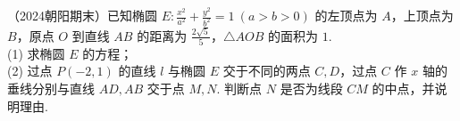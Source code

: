 \begin{example}
（2024朝阳期末）已知椭圆 $E:\frac{x^{2}}{a^{2}}+\frac{y^{2}}{b^{2}}=1\ (a>b>0)$ 的左顶点为 $A$，上顶点为 $B$，原点 $O$ 到直线 $AB$ 的距离为 $\frac{2\sqrt{5}}{5}$，$\triangle AOB$ 的面积为 $1$.\\
(1) 求椭圆 $E$ 的方程；\\
(2) 过点 $P(-2,1)$ 的直线 $l$ 与椭圆 $E$ 交于不同的两点 $C,D$，过点 $C$ 作 $x$ 轴的垂线分别与直线 $AD,AB$ 交于点 $M,N$. 判断点 $N$ 是否为线段 $CM$ 的中点，并说明理由.
\end{example}
